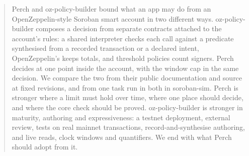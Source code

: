\begin{abstract}
Perch and oz-policy-builder bound what an app may do from an OpenZeppelin-style
Soroban smart account in two different ways. oz-policy-builder composes a
decision from separate contracts attached to the account's rules: a shared
interpreter checks each call against a predicate synthesised from a recorded
transaction or a declared intent, OpenZeppelin's  keeps
totals, and threshold policies count signers. Perch decides at one point inside
the account, with the window cap in the same decision. We compare the two from
their public documentation and source at fixed revisions, and from one task run
in both in soroban-sim. Perch is stronger where a limit must hold over time,
where one place should decide, and where the core check should be proved.
oz-policy-builder is stronger in maturity, authoring and expressiveness: a
testnet deployment, external review, tests on real mainnet transactions,
record-and-synthesise authoring, and live reads, clock windows and quantifiers.
We end with what Perch should adopt from it.
\end{abstract}

